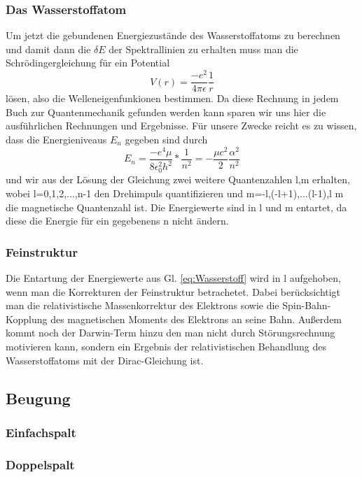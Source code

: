 \documentclass[]{article}
\begin{document}
\subsubsection{Das Wasserstoffatom}
Um jetzt die gebundenen Energiezustände des Wasserstoffatoms zu berechnen und damit dann die $\delta E$ der Spektrallinien zu erhalten muss man die Schrödingergleichung für ein Potential
\begin{equation}
	V(r)=\frac{-e^2}{4\pi \epsilon} \frac{1}{r}
\end{equation}
lösen, also die Welleneigenfunkionen bestimmen. Da diese Rechnung in jedem Buch zur Quantenmechanik gefunden werden kann sparen wir uns hier die ausführlichen Rechnungen und Ergebnisse. Für unsere Zwecke reicht es zu wissen, dass die Energieniveaus $E_{n}$ gegeben sind durch
\begin{equation}
\label{eq:Wasserstoff}
	E_{n}=\frac{-e^4\mu}{8\epsilon_0^2h^2}*\frac{1}{n^2}=-\frac{\mu c^2}{2}\frac{\alpha^2}{n^2}
\end{equation} und wir aus der Lösung der Gleichung zwei weitere Quantenzahlen l,m erhalten, wobei l=0,1,2,...,n-1 den Drehimpuls quantifizieren und m=-l,(-l+1),...(l-1),l m die magnetische Quantenzahl ist. Die Energiewerte sind in l und m entartet, da diese die Energie für ein gegebenens n nicht ändern.
\subsubsection{Feinstruktur}
Die Entartung der Energiewerte aus Gl. \ref{eq:Wasserstoff} wird in l aufgehoben, wenn man die Korrekturen der Feinstruktur betrachetet. Dabei berücksichtigt man die relativistische Massenkorrektur des Elektrons sowie die Spin-Bahn-Kopplung des magnetischen Moments des Elektrons an seine Bahn. Außerdem kommt noch der Darwin-Term hinzu den man nicht durch Störungsrechnung motivieren kann, sondern ein Ergebnis der relativistischen Behandlung des Wasserstoffatoms mit der Dirac-Gleichung ist. 

\subsection{Beugung}
\subsubsection{Einfachspalt}
\subsubsection{Doppelspalt}
\end{document}
